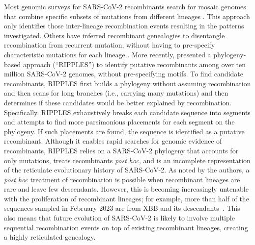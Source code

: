 \documentclass{article}
\begin{document}
Most genomic surveys for SARS-CoV-2 recombinants search for mosaic genomes that
combine specific subsets of mutations from different lineages
\citep[e.g.][]{VanInsberghe2021-eu,Jackson2021-ik,Wertheim2022-hj,Sekizuka2022-xz}.
This approach only identifies those inter-lineage recombination events
resulting in the patterns investigated. Others have inferred recombinant
genealogies to disentangle recombination from recurrent mutation, without
having to pre-specify characteristic mutations for each lineage
\citep{Ignatieva2021-rg}. More recently, \cite{Turakhia2022-it} presented a
phylogeny-based approach (``RIPPLES'') to identify putative recombinants among
over ten million SARS-CoV-2 genomes, without pre-specifying motifs. To find
candidate recombinants, RIPPLES first builds a phylogeny without assuming
recombination and then scans for long branches (i.e., carrying many mutations)
and then determines if these candidates would be better explained by
recombination. Specifically, RIPPLES exhaustively breaks each candidate
sequence into segments and attempts to find more parsimonious placements for
each segment on the phylogeny. If such placements are found, the sequence is
identified as a putative recombinant. Although it enables rapid searches for
genomic evidence of recombinants, RIPPLES relies on a SARS-CoV-2 phylogeny that
accounts for only mutations, treats recombinants \textit{post hoc}, and is an
incomplete representation of the reticulate evolutionary history of SARS-CoV-2.
As noted by the authors, a \textit{post hoc} treatment of recombination is
possible when recombinant lineages are rare and leave few descendants. However,
this is becoming increasingly untenable with the proliferation of recombinant
lineages; for example, more than half of the sequences sampled in February 2023
are from XBB and its descendants~\citep{Chen2022-pz}. This also means that
future evolution of SARS-CoV-2 is likely to involve multiple sequential
recombination events on top of existing recombinant lineages, creating a highly
reticulated genealogy.

\end{document}
